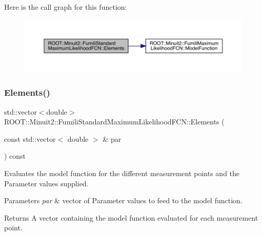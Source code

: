 Here is the call graph for this function\+:
\nopagebreak
\begin{figure}[H]
\begin{center}
\leavevmode
\includegraphics[width=350pt]{dd/d40/classROOT_1_1Minuit2_1_1FumiliStandardMaximumLikelihoodFCN_a19866fac44787dee8e2a6a35e7a15fe1_cgraph}
\end{center}
\end{figure}
\mbox{\label{classROOT_1_1Minuit2_1_1FumiliStandardMaximumLikelihoodFCN_af104474f9095c245b467f9db554a126a}} 
\subsubsection{\texorpdfstring{Elements()}{Elements()}\hspace{0.1cm}{\footnotesize\ttfamily [2/3]}}
{\footnotesize\ttfamily std\+::vector$<$double$>$ R\+O\+O\+T\+::\+Minuit2\+::\+Fumili\+Standard\+Maximum\+Likelihood\+F\+C\+N\+::\+Elements (\begin{DoxyParamCaption}\item[{const std\+::vector$<$ double $>$ \&}]{par }\end{DoxyParamCaption}) const\hspace{0.3cm}{\ttfamily [virtual]}}

Evaluates the model function for the different measurement points and the Parameter values supplied.


\begin{DoxyParams}{Parameters}
{\em par} & vector of Parameter values to feed to the model function.\\
\hline
\end{DoxyParams}
\begin{DoxyReturn}{Returns}
A vector containing the model function evaluated for each measurement point. 
\end{DoxyReturn}


